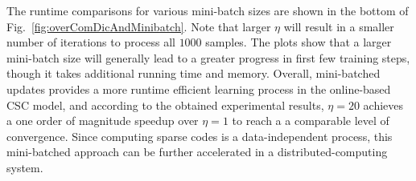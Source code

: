 The runtime comparisons for various mini-batch sizes are shown in the
bottom of Fig.~\ref{fig:overComDicAndMinibatch}. Note that larger
$\eta$ will result in a smaller number of iterations to process all
$1000$ samples. The plots show that a larger mini-batch size will
generally lead to a greater progress in first few training steps,
though it takes additional running time and memory. Overall,
mini-batched updates provides a more runtime efficient learning
process in the online-based CSC model, and according to the obtained
experimental results, $\eta=20$ achieves a one order of magnitude
speedup over $\eta=1$ to reach a a comparable level of
convergence. Since computing sparse codes is a data-independent
process, this mini-batched approach can be further accelerated in a
distributed-computing system.




